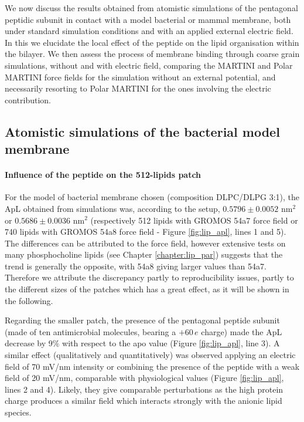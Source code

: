 We now discuss the results obtained from atomistic simulations of the pentagonal peptidic subunit in contact with a model bacterial or mammal membrane, both under standard simulation conditions and with an applied external electric field. In this we elucidate the local effect of the peptide on the lipid organisation within the bilayer.
%
We then assess the process of membrane binding through coarse grain simulations, without and with electric field, comparing the MARTINI and Polar MARTINI force fields for the simulation without an external potential, and necessarily resorting to Polar MARTINI for the ones involving the electric contribution. 


\subsection{Atomistic simulations of the bacterial model membrane}

\paragraph{Influence of the peptide on the 512-lipids patch} For the model of bacterial membrane chosen (composition DLPC/DLPG 3:1), the ApL obtained from simulations was, according to the setup, $0.5796\pm0.0052$ nm$^2$ or $0.5686\pm0.0036$ nm$^2$ (respectively 512 lipids with GROMOS 54a7 force field or 740 lipids with GROMOS 54a8 force field - Figure \ref{fig:lip_apl}, lines 1 and 5).
%
The differences can be attributed to the force field, however extensive tests on many phosphocholine lipids (see Chapter \ref{chapter:lip_par}) suggests that the trend is generally the opposite, with 54a8 giving larger values than 54a7.
%
Therefore we attribute the discrepancy partly to reproducibility issues, partly to the different sizes of the patches which has a great effect, as it will be shown in the following.

Regarding the smaller patch, the presence of the pentagonal peptide subunit (made of ten antimicrobial molecules, bearing a $+60\,e$ charge) made the ApL decrease by 9\% with respect to the apo value (Figure \ref{fig:lip_apl}, line 3).
%
A similar effect (qualitatively and quantitatively) was observed applying an electric field of 70 mV/nm intensity or combining the presence of the peptide with a weak field of 20 mV/nm, comparable with physiological values (Figure \ref{fig:lip_apl}, lines 2 and 4).
%
Likely, they give comparable perturbations as the high protein charge produces a similar field which interacts strongly with the anionic lipid species.
 
